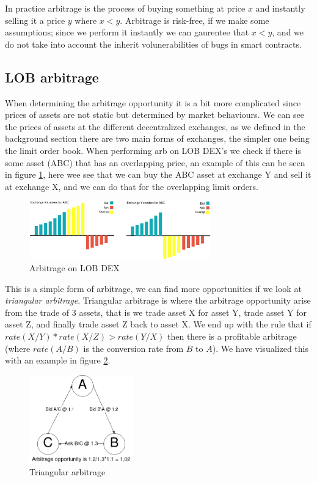 In practice arbitrage is the process of buying something at price $x$ and instantly selling it a price $y$ where $x<y$. Arbitrage is risk-free, if we make some assumptions; since we perform it instantly we can gaurentee that $x<y$, and we do not take into account the inherit volunerabilities of bugs in smart contracts.

\subsection{LOB arbitrage}

When determining the arbitrage opportunity it is a bit more complicated since prices of assets are not static but determined by market behaviours. We can see the prices of assets at the different decentralized exchanges, as we defined in the background section there are two main forms of exchanges, the simpler one being the limit order book. When performing arb on LOB DEX's we check if there is some asset (ABC) that has an overlapping price, an example of this can be seen in figure \ref{fig:ArbLOB}, here wee see that we can buy the ABC asset at exchange Y and sell it at exchange X, and we can do that for the overlapping limit orders.
\begin{figure}[h]
\centering
\includegraphics[width=0.7\textwidth]{assests/Flash-loans-Arbitrage-Overlap-1}
\caption{Arbitrage on LOB DEX}
\label{fig:ArbLOB}
\end{figure}
This is a simple form of arbitrage, we can find more opportunities if we look at \textit{triangular arbitrage}. Triangular arbitrage is where the arbitrage opportunity arise from the trade of 3 assets, that is we trade asset X for asset Y, trade asset Y for asset Z, and finally trade asset Z back to asset X. We end up with the rule that if $rate(X/Y)*rate(X/Z)>rate(Y/X)$ then there is a profitable arbitrage (where $rate(A/B)$ is the conversion rate from $B$ to $A$). We have visualized this with an example in figure \ref{fig:ArbTrig}.
\begin{figure}[h]
\centering
\includegraphics[width=0.4\textwidth]{assests/Flash-loans-Arbitrage-triangular}
\caption{Triangular arbitrage}
\label{fig:ArbTrig}
\end{figure}

